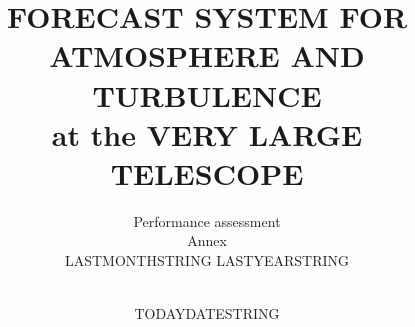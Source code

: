 \documentclass[a4paper]{article}
\title{FORECAST SYSTEM FOR ATMOSPHERE AND TURBULENCE\\
at the VERY LARGE TELESCOPE}
\author{
\vspace{1.0cm}
\begin{minipage}{9.5cm}
\begin{center}
\LARGE{Performance assessment}\\
\LARGE{Annex}\\
\LARGE{LASTMONTHSTRING LASTYEARSTRING}
\end{center}
\end{minipage}\\
\vspace{3cm}
}
\date{TODAYDATESTRING}
\begin{document}
 
\maketitle 


\contents     %







\end{document}
